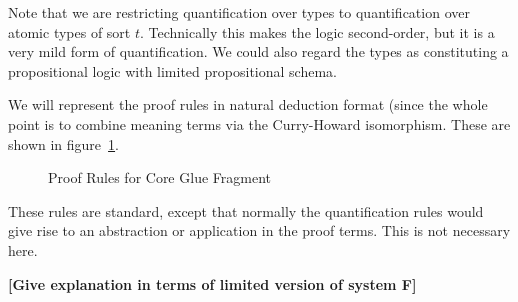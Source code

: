 Note that we are restricting quantification over types to
quantification over atomic types of sort $t$.  Technically this makes
the logic second-order, but it is a very mild form of quantification.
We could also regard the types as constituting a propositional logic
with limited propositional schema.

We will represent the proof rules in natural deduction format (since
the whole point is to combine meaning terms via the Curry-Howard
isomorphism.  These are shown in figure~\ref{figGLND}.
\begin{figure}
\begin{center}
\end{center}
\caption{Proof Rules for Core Glue Fragment \label{figGLND}}
\end{figure}
These rules are standard, except that normally the quantification
rules would give rise to an abstraction or application in the proof
terms.  This is not necessary here.   

{\bf [Give explanation in terms
of limited version of system F]}
 
